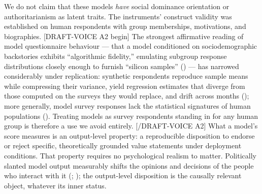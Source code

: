\documentclass[
]{article}
\begin{document}
We do not claim that these models \emph{have} social dominance
orientation or authoritarianism as latent traits. The instruments'
construct validity was established on human respondents with group
memberships, motivations, and biographies. {[}DRAFT-VOICE A2 begin{]}
The strongest affirmative reading of model questionnaire behaviour ---
that a model conditioned on sociodemographic backstories exhibits
``algorithmic fidelity,'' emulating subgroup response distributions
closely enough to furnish ``silicon samples''
() --- has narrowed
considerably under replication: synthetic respondents reproduce sample
means while compressing their variance, yield regression estimates that
diverge from those computed on the surveys they would replace, and drift
across months (); more
generally, model survey responses lack the statistical signatures of
human populations (). Treating models as survey respondents standing in for
any human group is therefore a use we avoid entirely. {[}/DRAFT-VOICE
A2{]} What a model's score measures is an output-level property: a
reproducible disposition to endorse or reject specific, theoretically
grounded value statements under deployment conditions. That property
requires no psychological realism to matter. Politically slanted model
output measurably shifts the opinions and decisions of the people who
interact with it (;
); the output-level
disposition is the causally relevant object, whatever its inner status.
\end{document}
